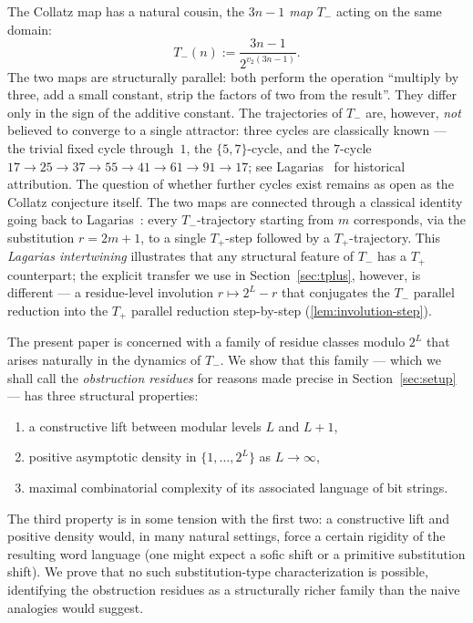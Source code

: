 \documentclass[11pt,reqno]{amsart}
\newcommand{\Tplus}{T_{+}}
\newcommand{\Tminus}{T_{-}}
\newcommand{\vtwo}{v_{2}}
\begin{document}
The Collatz map has a natural cousin, the \emph{$3n-1$ map} $\Tminus$ acting
on the same domain:
\[
\Tminus(n) := \frac{3n-1}{2^{\vtwo(3n-1)}}.
\]
The two maps are structurally parallel: both perform the operation
``multiply by three, add a small constant, strip the factors of two from the
result''. They differ only in the sign of the additive constant. The
trajectories of $\Tminus$ are, however, \emph{not} believed to converge to a
single attractor: three cycles are classically known --- the trivial
fixed cycle through~$1$, the $\{5, 7\}$-cycle, and the $7$-cycle
$17 \to 25 \to 37 \to 55 \to 41 \to 61 \to 91 \to 17$; see
Lagarias~\cite{Lagarias2010bib} for historical attribution. The question of
whether further cycles exist remains as open as the Collatz conjecture itself.
The two maps are connected through a classical identity going back to
Lagarias~\cite{Lagarias1985}: every $\Tminus$-trajectory starting from $m$
corresponds, via the substitution $r = 2m+1$, to a single $\Tplus$-step
followed by a $\Tplus$-trajectory. This \emph{Lagarias intertwining}
illustrates that any structural feature of $\Tminus$ has a $\Tplus$
counterpart; the explicit transfer we use in
Section~\ref{sec:tplus}, however, is different --- a residue-level
involution $r \mapsto 2^L - r$ that conjugates the $\Tminus$ parallel
reduction into the $\Tplus$ parallel reduction step-by-step
(\cref{lem:involution-step}).

The present paper is concerned with a family of residue classes modulo
$2^L$ that arises naturally in the dynamics of $\Tminus$. We show that this
family --- which we shall call the \emph{obstruction residues} for reasons
made precise in Section~\ref{sec:setup} --- has three structural properties:

\begin{enumerate}[label=(\arabic*)]
\item a constructive lift between modular levels $L$ and $L+1$,
\item positive asymptotic density in $\{1, \ldots, 2^L\}$ as $L \to \infty$,
\item maximal combinatorial complexity of its associated language of bit
  strings.
\end{enumerate}

The third property is in some tension with the first two: a constructive
lift and positive density would, in many natural settings, force a certain
rigidity of the resulting word language (one might expect a sofic shift or a
primitive substitution shift). We prove that no such substitution-type
characterization is possible, identifying the obstruction residues as a
structurally richer family than the naive analogies would suggest.
\end{document}
